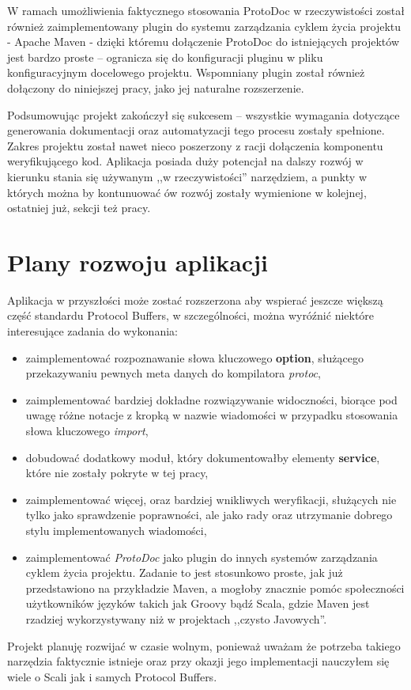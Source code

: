 \documentclass[pdflatex,11pt]{aghdpl}
\begin{document}
W ramach umożliwienia faktycznego stosowania ProtoDoc w rzeczywistości został również zaimplementowany plugin do systemu zarządzania cyklem życia projektu - 
Apache Maven \cite{Maven} - dzięki któremu dołączenie ProtoDoc do istniejących projektów jest bardzo proste -- ogranicza się do konfiguracji pluginu w pliku konfiguracyjnym docelowego projektu.
Wspomniany plugin został również dołączony do niniejszej pracy, jako jej naturalne rozszerzenie.

Podsumowując projekt zakończył się sukcesem -- wszystkie wymagania dotyczące generowania dokumentacji oraz automatyzacji tego procesu zostały spełnione.
Zakres projektu został nawet nieco poszerzony z racji dołączenia komponentu weryfikującego kod. Aplikacja posiada duży potencjał na dalszy rozwój
w kierunku stania się używanym ,,w rzeczywistości'' narzędziem, a punkty w których można by kontunuować ów rozwój zostały wymienione w kolejnej, ostatniej już, sekcji też pracy.

\section{Plany rozwoju aplikacji}
Aplikacja w przyszłości może zostać rozszerzona aby wspierać jeszcze większą część standardu 
Protocol Buffers, w szczególności, można wyróźnić niektóre interesujące zadania do wykonania:

\begin{itemize}
 \item zaimplementować rozpoznawanie słowa kluczowego \textbf{option}, służącego przekazywaniu pewnych meta danych do kompilatora \textit{protoc},
 \item zaimplementować bardziej dokładne rozwiązywanie widoczności, biorące pod uwagę różne notacje z kropką w nazwie wiadomości
       w przypadku stosowania słowa kluczowego \textit{import},
 \item dobudować dodatkowy moduł, który dokumentowałby elementy \textbf{service}, które nie zostały pokryte w tej pracy,
 \item zaimplementować więcej, oraz bardziej wnikliwych weryfikacji, służących nie tylko jako sprawdzenie poprawności, ale jako rady oraz utrzymanie dobrego stylu
       implementowanych wiadomości,
 \item zaimplementować \textit{ProtoDoc} jako plugin do innych systemów zarządzania cyklem życia projektu. Zadanie to jest stosunkowo proste, 
       jak już przedstawiono na przykładzie Maven, a mogłoby znacznie pomóc społeczności użytkowników języków takich jak Groovy bądź Scala, gdzie Maven 
       jest rzadziej wykorzystywany niż w projektach ,,czysto Javowych''.
\end{itemize}

Projekt planuję rozwijać w czasie wolnym, ponieważ uważam że potrzeba takiego narzędzia faktycznie istnieje oraz przy okazji jego 
implementacji nauczyłem się wiele o Scali jak i samych Protocol Buffers.


\appendix





\end{document}
